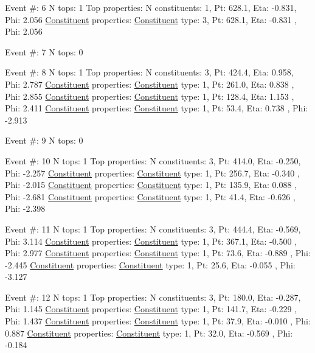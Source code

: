 \begin{DoxyCode}
Event #: 6
      N tops: 1
      Top properties: N constituents:   1,   Pt:  628.1,   Eta:  -0.831,   Phi:   2.056
          \hyperlink{classConstituent}{Constituent} properties: \hyperlink{classConstituent}{Constituent} type:   3,   Pt:  628.1,   Eta:  -0.831
      ,   Phi:   2.056

Event #: 7
      N tops: 0

Event #: 8
      N tops: 1
      Top properties: N constituents:   3,   Pt:  424.4,   Eta:   0.958,   Phi:   2.787
          \hyperlink{classConstituent}{Constituent} properties: \hyperlink{classConstituent}{Constituent} type:   1,   Pt:  261.0,   Eta:   0.838
      ,   Phi:   2.855
          \hyperlink{classConstituent}{Constituent} properties: \hyperlink{classConstituent}{Constituent} type:   1,   Pt:  128.4,   Eta:   1.153
      ,   Phi:   2.411
          \hyperlink{classConstituent}{Constituent} properties: \hyperlink{classConstituent}{Constituent} type:   1,   Pt:   53.4,   Eta:   0.738
      ,   Phi:  -2.913

Event #: 9
      N tops: 0

Event #: 10
      N tops: 1
      Top properties: N constituents:   3,   Pt:  414.0,   Eta:  -0.250,   Phi:  -2.257
          \hyperlink{classConstituent}{Constituent} properties: \hyperlink{classConstituent}{Constituent} type:   1,   Pt:  256.7,   Eta:  -0.340
      ,   Phi:  -2.015
          \hyperlink{classConstituent}{Constituent} properties: \hyperlink{classConstituent}{Constituent} type:   1,   Pt:  135.9,   Eta:   0.088
      ,   Phi:  -2.681
          \hyperlink{classConstituent}{Constituent} properties: \hyperlink{classConstituent}{Constituent} type:   1,   Pt:   41.4,   Eta:  -0.626
      ,   Phi:  -2.398

Event #: 11
      N tops: 1
      Top properties: N constituents:   3,   Pt:  444.4,   Eta:  -0.569,   Phi:   3.114
          \hyperlink{classConstituent}{Constituent} properties: \hyperlink{classConstituent}{Constituent} type:   1,   Pt:  367.1,   Eta:  -0.500
      ,   Phi:   2.977
          \hyperlink{classConstituent}{Constituent} properties: \hyperlink{classConstituent}{Constituent} type:   1,   Pt:   73.6,   Eta:  -0.889
      ,   Phi:  -2.445
          \hyperlink{classConstituent}{Constituent} properties: \hyperlink{classConstituent}{Constituent} type:   1,   Pt:   25.6,   Eta:  -0.055
      ,   Phi:  -3.127

Event #: 12
      N tops: 1
      Top properties: N constituents:   3,   Pt:  180.0,   Eta:  -0.287,   Phi:   1.145
          \hyperlink{classConstituent}{Constituent} properties: \hyperlink{classConstituent}{Constituent} type:   1,   Pt:  141.7,   Eta:  -0.229
      ,   Phi:   1.437
          \hyperlink{classConstituent}{Constituent} properties: \hyperlink{classConstituent}{Constituent} type:   1,   Pt:   37.9,   Eta:  -0.010
      ,   Phi:   0.887
          \hyperlink{classConstituent}{Constituent} properties: \hyperlink{classConstituent}{Constituent} type:   1,   Pt:   32.0,   Eta:  -0.569
      ,   Phi:  -0.184


\end{DoxyCode}
